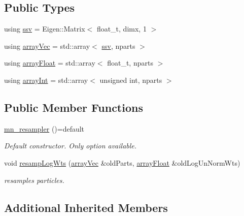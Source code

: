\subsection*{Public Types}
\begin{DoxyCompactItemize}
\item 
using \hyperlink{classmn__resampler_a1cb075b42f73e01de7fc1b27f51bfc4c}{ssv} = Eigen\+::\+Matrix$<$ float\+\_\+t, dimx, 1 $>$
\item 
using \hyperlink{classmn__resampler_aa8ff37576399807b14a7a12615032bb1}{array\+Vec} = std\+::array$<$ \hyperlink{classrbase_ae20e0b8df15aa109252f57ecbf1f20f8}{ssv}, nparts $>$
\item 
using \hyperlink{classmn__resampler_ae26be2889cf3cd4ddea66928d879809e}{array\+Float} = std\+::array$<$ float\+\_\+t, nparts $>$
\item 
using \hyperlink{classmn__resampler_afb5d000e2464afef813792c57c42599b}{array\+Int} = std\+::array$<$ unsigned int, nparts $>$
\end{DoxyCompactItemize}
\subsection*{Public Member Functions}
\begin{DoxyCompactItemize}
\item 
\mbox{\label{classmn__resampler_a016a00570c30806a0fdad25385395f95}} 
\hyperlink{classmn__resampler_a016a00570c30806a0fdad25385395f95}{mn\+\_\+resampler} ()=default
\begin{DoxyCompactList}\small\item\em Default constructor. Only option available. \end{DoxyCompactList}\item 
void \hyperlink{classmn__resampler_a13b1897e180a791a3a099d5d6329a125}{resamp\+Log\+Wts} (\hyperlink{classrbase_aa12fc826befa6ba0647b5f59ebc396ee}{array\+Vec} \&old\+Parts, \hyperlink{classrbase_a6f76bef853e508cb5b6f546d231b06f5}{array\+Float} \&old\+Log\+Un\+Norm\+Wts)
\begin{DoxyCompactList}\small\item\em resamples particles. \end{DoxyCompactList}\end{DoxyCompactItemize}
\subsection*{Additional Inherited Members}


